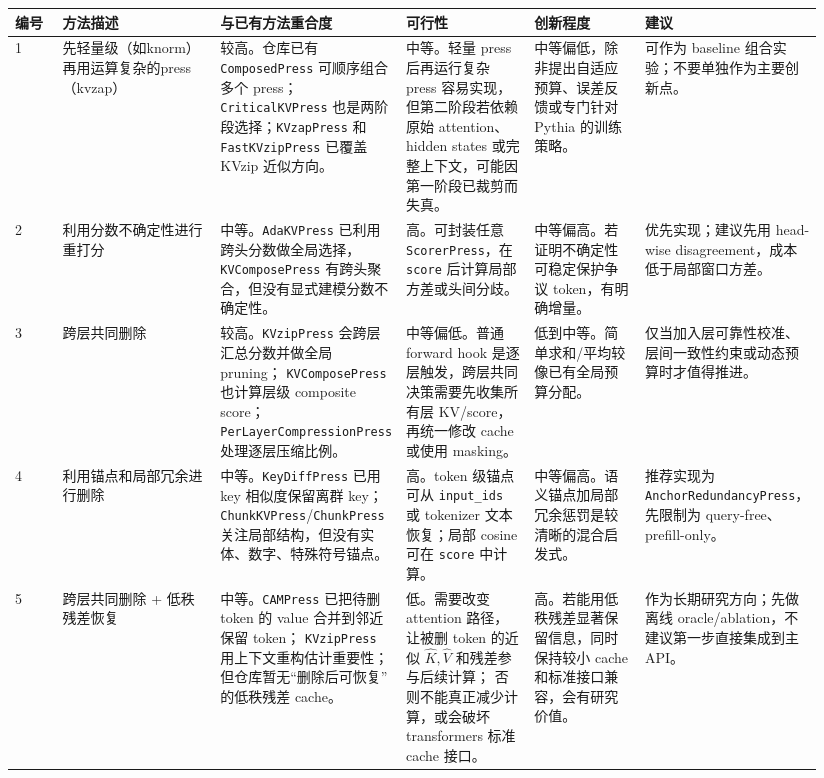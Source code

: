 \documentclass[UTF8]{ctexart}
\begin{document}
\begin{tabular}{p{0.06\linewidth}p{0.20\linewidth}p{0.22\linewidth}p{0.16\linewidth}p{0.14\linewidth}p{0.16\linewidth}}
\toprule
编号 & 方法描述 & 与已有方法重合度 & 可行性 & 创新程度 & 建议 \\
\midrule
1 &
先轻量级（如knorm）再用运算复杂的press（kvzap）&
较高。仓库已有 \texttt{ComposedPress} 可顺序组合多个 press；
\texttt{CriticalKVPress} 也是两阶段选择；\texttt{KVzapPress} 和
\texttt{FastKVzipPress} 已覆盖 KVzip 近似方向。 &
中等。轻量 press 后再运行复杂 press 容易实现，但第二阶段若依赖原始 attention、
hidden states 或完整上下文，可能因第一阶段已裁剪而失真。 &
中等偏低，除非提出自适应预算、误差反馈或专门针对 Pythia 的训练策略。 &
可作为 baseline 组合实验；不要单独作为主要创新点。 \\
\midrule
2 &
利用分数不确定性进行重打分 &
中等。\texttt{AdaKVPress} 已利用跨头分数做全局选择，
\texttt{KVComposePress} 有跨头聚合，但没有显式建模分数不确定性。 &
高。可封装任意 \texttt{ScorerPress}，在 \texttt{score} 后计算局部方差或头间分歧。 &
中等偏高。若证明不确定性可稳定保护争议 token，有明确增量。 &
优先实现；建议先用 head-wise disagreement，成本低于局部窗口方差。 \\
\midrule
3 &
跨层共同删除 &
较高。\texttt{KVzipPress} 会跨层汇总分数并做全局 pruning；
\texttt{KVComposePress} 也计算层级 composite score；
\texttt{PerLayerCompressionPress} 处理逐层压缩比例。 &
中等偏低。普通 forward hook 是逐层触发，跨层共同决策需要先收集所有层 KV/score，
再统一修改 cache 或使用 masking。 &
低到中等。简单求和/平均较像已有全局预算分配。 &
仅当加入层可靠性校准、层间一致性约束或动态预算时才值得推进。 \\
\midrule
4 &
利用锚点和局部冗余进行删除 &
中等。\texttt{KeyDiffPress} 已用 key 相似度保留离群 key；
\texttt{ChunkKVPress}/\texttt{ChunkPress} 关注局部结构，但没有实体、数字、特殊符号锚点。 &
高。token 级锚点可从 \texttt{input\_ids} 或 tokenizer 文本恢复；局部 cosine
可在 \texttt{score} 中计算。 &
中等偏高。语义锚点加局部冗余惩罚是较清晰的混合启发式。 &
推荐实现为 \texttt{AnchorRedundancyPress}，先限制为 query-free、prefill-only。 \\
\midrule
5 &
跨层共同删除 + 低秩残差恢复 &
中等。\texttt{CAMPress} 已把待删 token 的 value 合并到邻近保留 token；
\texttt{KVzipPress} 用上下文重构估计重要性；但仓库暂无``删除后可恢复''
的低秩残差 cache。 &
低。需要改变 attention 路径，让被删 token 的近似 \(\hat K,\hat V\) 和残差参与后续计算；
否则不能真正减少计算，或会破坏 transformers 标准 cache 接口。 &
高。若能用低秩残差显著保留信息，同时保持较小 cache 和标准接口兼容，会有研究价值。 &
作为长期研究方向；先做离线 oracle/ablation，不建议第一步直接集成到主 API。 \\
\bottomrule
\end{tabular}
\end{document}
